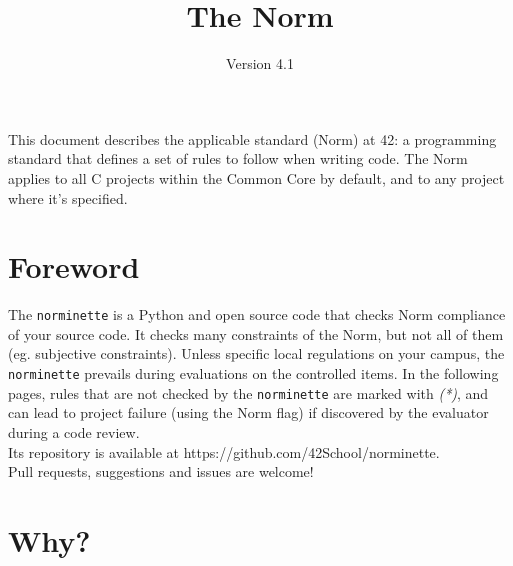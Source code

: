 \documentclass{42-en}
\begin{document}
\title{The Norm}
\subtitle{Version 4.1}

\summary
{
    This document describes the applicable standard (Norm) at 42: a
    programming standard that defines a set of rules to follow when writing code.
    The Norm applies to all C projects within the Common Core by default, and
    to any project where it's specified.
}

\maketitle

\tableofcontents



\chapter{Foreword}

The \texttt{norminette} is a Python and open source code that checks Norm
compliance of your source code. It checks many constraints of the Norm, but not
all of them (eg. subjective constraints). Unless specific local regulations on
your campus, the \texttt{norminette} prevails during evaluations on the controlled
items. In the following pages, rules that are not checked by the \texttt{norminette}
are marked with \textit{(*)}, and can lead to project failure (using the Norm flag) if
discovered by the evaluator during a code review.\\

Its repository is available at https://github.com/42School/norminette.\\

Pull requests, suggestions and issues are welcome!

\newpage


%
%
    \chapter{Why?}
\end{document}

